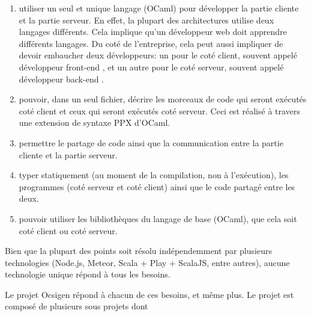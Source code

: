 \begin{enumerate}
  \item utiliser un seul et unique langage (OCaml) pour développer la partie cliente et
    la partie serveur. En effet, la plupart des architectures utilise deux
    langages différents. Cela implique qu'un développeur web doit apprendre différents
    langages. Du coté de l'entreprise, cela peut aussi impliquer de devoir
    embaucher deux développeurs: un pour le coté client, souvent appelé
    \og développeur front-end \fg, et un autre pour le coté serveur, souvent appelé
    \og développeur back-end \fg.
  \item pouvoir, dans un seul fichier, décrire les morceaux de code qui seront
exécutés coté client et ceux qui seront exécutés coté serveur. Ceci est réalisé
à travers une extension de syntaxe PPX d'OCaml.
  \item permettre le partage de code ainsi que la communication entre la partie
    cliente et la partie serveur.
  \item typer statiquement (au moment de la compilation, non à l'exécution), les
    programmes (coté serveur et coté client) ainsi que le code partagé entre les deux.
  \item pouvoir utiliser les bibliothèques du langage de base (OCaml), que cela
    soit coté client ou coté serveur.
\end{enumerate}

Bien que la plupart des points soit résolu indépendemment par plusieurs
technologies (Node.js\cite{nodejs-website}, Meteor\cite{meteor-website},
Scala\cite{scala-website} + Play\cite{play-website} +
ScalaJS\cite{scalajs-website}, entre autres), aucune technologie unique répond à tous les besoins.

Le projet Ocsigen répond à chacun de ces besoins, et même plus. Le projet est
composé de plusieurs sous projets dont

